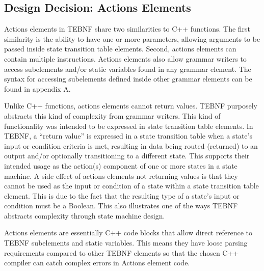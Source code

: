 \subsection{Design Decision: Actions Elements}
Actions elements in TEBNF share two similarities to C++ functions. The first similarity is the ability to have one or more parameters, allowing arguments to be passed inside state transition table elements.  Second, actions elements can contain multiple instructions.  Actions elements also allow grammar writers to access subelements and/or static variables found in any grammar element.  The syntax for accessing subelements defined inside other grammar elements can be found in appendix A.

\indent
Unlike C++ functions, actions elements cannot return values.  TEBNF purposely abstracts this kind of complexity from grammar writers.  This kind of functionality was intended to be expressed in state transition table elements.  In TEBNF, a “return value” is expressed in a state transition table when a state’s input or condition criteria is met, resulting in data being routed (returned) to an output and/or optionally transitioning to a different state.  This supports their intended usage as the action(s) component of one or more states in a state machine.  A side effect of actions elements not returning values is that they cannot be used as the input or condition of a state within a state transition table element.  This is due to the fact that the resulting type of a state’s input or condition must be a Boolean.  This also illustrates one of the ways TEBNF abstracts complexity through state machine design.

\indent
Actions elements are essentially C++ code blocks that allow direct reference to TEBNF subelements and static variables.  This means they have loose parsing requirements compared to other TEBNF elements so that the chosen C++ compiler can catch complex errors in Actions element code.

